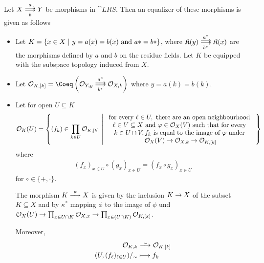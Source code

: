 \documentclass[a4paper,parskip=half,numbers=enddot, DIV=12]{scrreprt}
\begin{document}
\begin{prop}
    Let $X\doublemorphism[a][b] Y$ be morphisms in $\cat{LRS}$. Then an equalizer of these morphisms is given as follows
    \begin{itemize}
      \item 
        Let $K = \left\{ x\in X\ \middle|\  y= a(x) = b(x) \text{ and } a*=b*\right\}$, where $\KK(y) \doublemorphism[a^*][b^*] \KK(x)$ are the morphisms defined by $a$ and $b$ on the residue fields. Let $K$ be equipped with the subspace topology induced from $X$.
      \item 
        Let $\Oo_{K,[k]} = \Coeq\left(\Oo_{Y,y} \doublemorphism[a^*][b^*] \Oo_{X,k}\right)$ where $y=a(k) = b(k)$.
      \item 
        Let for open $U\subseteq K$ 
        \begin{align*}
            \Oo_K(U) = \left\{(f_k)\in \prod_{k\in U} \Oo_{K,[k]} \st \begin{array}{c}
                \text{for every } \ell\in U, \text{ there are an open neighbourhood } \\
                \ell\in V \subseteq X \text{ and } \phi\in\Oo_X(V) \text{ such that for every } \\
                k\in U\cap V, f_k \text{ is equal to the image of }\phi\text{ under }\\
                \Oo_X(V) \morphism \Oo_{X,k} \morphism\Oo_{K,[k]}
            \end{array}
            \right\}
        \end{align*}
        where 
        \begin{align*}
            (f_x)_{x\in U} \circ (g_x)_{x\in U} = (f_x\circ g_x)_{x\in U}
        \end{align*}
        for $\circ \in\{+,\cdot\}$.
        
        The morphism $K\morphism[\kappa] X$ is given by the inclusion $K\morphism X$ of the subset $K\subseteq X$ and by $\kappa^*$ mapping $\phi$ to the image of $\phi$ und $\Oo_X(U) \morphism \prod_{x\in U\cap K} \Oo_{X,x} \morphism \prod_{x\in (U\cap K)} \Oo_{K,[x]}$.
        
        Moreover,
        \begin{align*}
            \Oo_{K,k} &\isomorphism \Oo_{K,[k]}\\
            (U,(f_\ell)_{\ell\in U})/_\sim &\longmapsto f_k
        \end{align*}
    \end{itemize}
\end{prop}
\end{document}

